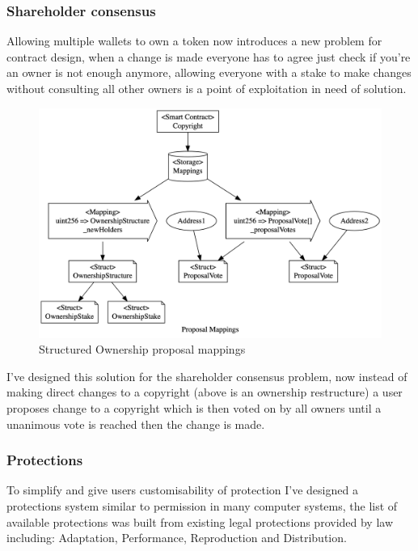 \subsubsection{Shareholder consensus}

Allowing multiple wallets to own a token now introduces a new problem for contract design, when a change is made everyone has to agree just check if you're an owner is not enough anymore, allowing everyone with a stake to make changes without consulting all other owners is a point of exploitation in need of solution.

\begin{figure}[H]
\caption{Structured Ownership proposal mappings}
\centering
\includegraphics[width=\textwidth,height=\textheight,keepaspectratio]{images/operational/prop-mappings.png}
\end{figure}

I've designed this solution for the shareholder consensus problem, now instead of making direct changes to a copyright (above is an ownership restructure) a user proposes change to a copyright which is then voted on by all owners until a unanimous vote is reached then the change is made.

\subsubsection{Protections}

To simplify and give users customisability of protection I've designed a protections system similar to permission in many computer systems, the list of available protections was built from existing legal protections provided by  law \cite{rights_granted} including: Adaptation, Performance, Reproduction and Distribution. 

